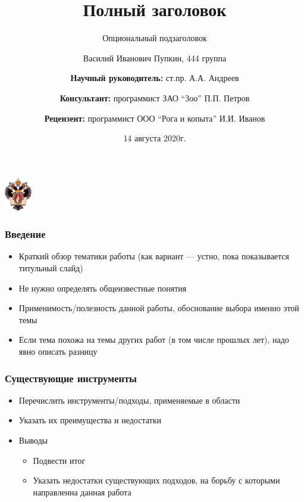 \documentclass{beamer}
\title[Короткое название]{Полный заголовок}
\subtitle[]{Опциональный подзаголовок}
\institute[СПбГУ]{
Санкт-Петербургский государственный университет \\
Кафедра системного программирования }
\author[Василий Пупкин]{Василий Иванович Пупкин, 444 группа \\
  \and  
    {\bfseries Научный руководитель:} ст.пр. А.А. Андреев \\ 
  \and %
    {\bfseries Консультант:} программист ЗАО ``Зоо'' П.П. Петров \\ 
  \and
    {\bfseries Рецензент:} программист ООО ``Рога и копыта'' И.И. Иванов}
\date{14 августа 2020г.}
\begin{document}
{
\begin{frame}
  \begin{center}
  {\includegraphics[width=1.2cm]{pictures/SPbGU_Logo.png}}
  \end{center}
  \vspace{-1cm}
  \titlepage
\end{frame}
}

\begin{frame}[fragile]
  \transwipe[direction=90]
  \frametitle{Введение}
  \begin{itemize}
    \item Краткий обзор тематики работы (как вариант --- устно, пока показывается титульный слайд)
    \item Не нужно определять общеизвестные понятия
    \item Применимость/полезность данной работы, обоснование выбора именно этой темы 
    \item Если тема похожа на темы других работ (в том числе прошлых лет), надо явно описать разницу
  \end{itemize}
\end{frame}
            
\begin{frame}
  \transwipe[direction=90]
  \frametitle{Существующие инструменты}
  \begin{itemize}
    \item Перечислить инструменты/подходы, применяемые в области
    \item Указать их преимущества и недостатки
  \end{itemize}
  
  \begin{itemize}
    \item Выводы
    \begin{itemize}
      \item Подвести итог
      \item Указать недостатки существующих подходов, на борьбу с которыми 
направленна данная работа
    \end{itemize}
  \end{itemize}
\end{frame}
\end{document}
